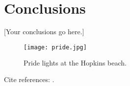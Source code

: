 \chapter*{Conclusions}
\label{ch:conclusion}

[Your conclusions go here.]

\begin{figure}[h]
    \centering
    \texttt{[image: pride.jpg]}
    \caption{Pride lights at the Hopkins beach.}
    \label{fig:jhu_pride}
\end{figure}

Cite references: \cite{example2025, examplebook2024, exampleconf2023}. 